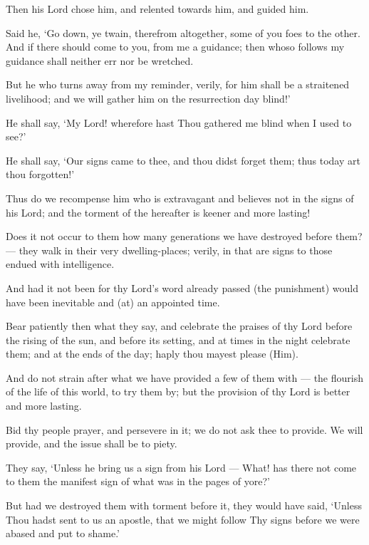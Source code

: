 \documentclass[fontsize=14pt, letterpaper, notitlepage, openany, DIV=12]{scrbook} %
\begin{document}
\noindent[20:122]
Then his Lord chose him, and relented towards him, and guided him.

\noindent[20:123]
Said he, `Go down, ye twain, therefrom altogether, some of you foes to the other. And if
there should come to you, from me a guidance; then whoso follows my guidance shall neither err
nor be wretched.

\noindent[20:124]
But he who turns away from my reminder, verily, for him shall be a straitened livelihood;
and we will gather him on the resurrection day blind!'

\noindent[20:125]
He shall say, `My Lord! wherefore hast Thou gathered me blind when I used to see?'

\noindent[20:126]
He shall say, `Our signs came to thee, and thou didst forget them; thus today art thou
forgotten!'

\noindent[20:127]
Thus do we recompense him who is extravagant and believes not in the signs of his Lord;
and the torment of the hereafter is keener and more lasting!

\noindent[20:128]
Does it not occur to them how many generations we have destroyed before them?--- they
walk in their very dwelling-places; verily, in that are signs to those endued with intelligence.

\noindent[20:129]
And had it not been for thy Lord's word already passed (the punishment) would have
been inevitable and (at) an appointed time.

\noindent[20:130]
Bear patiently then what they say, and celebrate the praises of thy Lord before the rising
of the sun, and before its setting, and at times in the night celebrate them; and at the ends of the
day; haply thou mayest please (Him).

\noindent[20:131]
And do not strain after what we have provided a few of them with --- the flourish of the
life of this world, to try them by; but the provision of thy Lord is better and more lasting.

\noindent[20:132]
Bid thy people prayer, and persevere in it; we do not ask thee to provide. We will
provide, and the issue shall be to piety.

\noindent[20:133]
They say, `Unless he bring us a sign from his Lord --- What! has there not come to them
the manifest sign of what was in the pages of yore?'

\noindent[20:134]
But had we destroyed them with torment before it, they would have said, `Unless Thou
hadst sent to us an apostle, that we might follow Thy signs before we were abased and put to
shame.'
\end{document}
